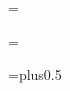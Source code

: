 \newif\ifinfloat \infloatfalse
\newif\ifnomargin \nomarginfalse

\def\nomargin{\nomargintrue}


%
%

\newif\iftitle \titlefalse
\newif\ifblank \blankfalse

\newtoks\rcstoks
\newif\ifrcs \rcsfalse

\def\rcsid$#1${\rcstrue\rcstoks={#1}}

\def\rcstag{\ifrcs \tensf\$\the\rcstoks\$\fi}

\headline={\ifblank\hfil\else\iftitle\hfil\else
  \ifodd\pageno\rightheadline\else\leftheadline\fi\fi\fi}

\footline={\ifblank
    \hfil
  \else\iftitle
    \ifodd\pageno\rightnumfoot\else\leftnumfoot\fi
  \else
    \rcstag\hfil
  \fi\fi}

\def\leftheadline{\tenit\thepageno\quad\lhead\hfill}
\def\rightheadline{\hfill\tenit\rhead\quad\thepageno}

\def\leftnumfoot{\tenit\thepageno\hfil\rcstag}
\def\rightnumfoot{\rcstag\hfil\tenit\thepageno}

\def\lhead{} %
\def\rhead{\firstmark} %

\def\thepageno{\folio}


%
%

\skip\footins=\grid plus0.5\grid
\dimen{}\grid
\count{}

\def\footnote{\fnmark\fntext}

\def\fnmark{\edef\@sf{\spacefactor\the\spacefactor}%
  \global\advance\footcnt by1
  \hyperanchor@\fntag{fn}%
  \hyperlink{\fntag a}{$^{\number\footcnt}$}\@sf}

\def\fntext{\insert\footins\bgroup\eightpoint
  \interlinepenalty=\interfootnotelinepenalty
  \let\par=\endgraf
  \leftskip=0pt \rightskip=0pt
  \splittopskip=\ht\strutbox %
  \splitmaxdepth=\dp\strutbox \floatingpenalty=20000
  \noindent 
  \hyperanchor{\fntag a}\hyperlink\fntag{$^{\number\footcnt}$}\enspace
  \bgroup\strut
  \aftergroup\@foot\let\next}
\def\@foot{\strut\egroup}


%
% 


